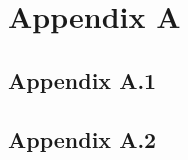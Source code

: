 
\clearpage
\section*{Appendix A}
\label{sec:appendix-a}


\subsection*{Appendix A.1}
\label{sec:appendix-a1}

\lipsum[1]

\subsection*{Appendix A.2}
\label{sec:appendix-a2}

\lipsum[1]


